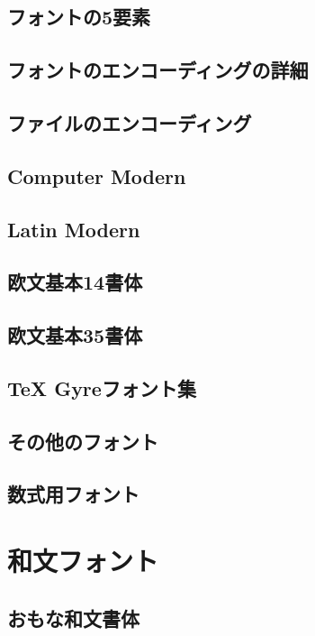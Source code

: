 \documentclass{jsbook}
\begin{document}
\section{フォントの5要素}

\section{フォントのエンコーディングの詳細}

\section{ファイルのエンコーディング}

\section{Computer Modern}

\section{Latin Modern}

\section{欧文基本14書体}

\section{欧文基本35書体}

\section{TeX Gyreフォント集}

\section{その他のフォント}

\section{数式用フォント}

\chapter{和文フォント}

\section{おもな和文書体}
\end{document}
